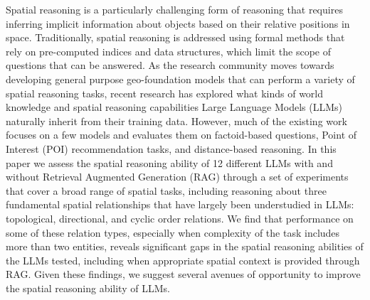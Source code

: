 
Spatial reasoning is a particularly challenging form of reasoning that requires inferring implicit information about objects based on their relative positions in space.
Traditionally, spatial reasoning is addressed using formal methods that rely on pre-computed indices and data structures, which limit the scope of questions that can be answered.
As the research community moves towards developing general purpose geo-foundation models that can perform a variety of spatial reasoning tasks, recent research has explored what kinds of world knowledge and spatial reasoning capabilities Large Language Models (LLMs) naturally inherit from their training data.
However, much of the existing work focuses on a few models and evaluates them on factoid-based questions, Point of Interest (POI) recommendation tasks, and distance-based reasoning.
In this paper we assess the spatial reasoning ability of 12 different LLMs with and without Retrieval Augmented Generation (RAG) through a set of experiments that cover a broad range of spatial tasks, including reasoning about three fundamental spatial relationships that have largely been understudied in LLMs: topological, directional, and cyclic order relations.
We find that performance on some of these relation types, especially when complexity of the task includes more than two entities, reveals significant gaps in the spatial reasoning abilities of the LLMs tested, including when appropriate spatial context is provided through RAG.
Given these findings, we suggest several avenues of opportunity to improve the spatial reasoning ability of LLMs.
